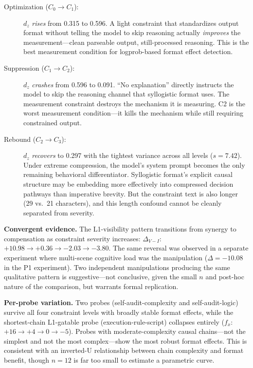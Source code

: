 \documentclass[11pt]{article}
\begin{document}
\begin{description}
\item[Optimization ($C_0 \to C_1$):] $d_z$ \textit{rises} from 0.315 to 0.596.
  A light constraint that standardizes output format without telling the model
  to skip reasoning actually \textit{improves} the measurement---clean parseable
  output, still-processed reasoning. This is the best measurement condition for
  logprob-based format effect detection.

\item[Suppression ($C_1 \to C_2$):] $d_z$ \textit{crashes} from 0.596 to 0.091.
  ``No explanation'' directly instructs the model to skip the
  reasoning channel that syllogistic format uses. The measurement constraint
  destroys the mechanism it is measuring. C2 is the worst measurement
  condition---it kills the mechanism while still requiring constrained output.

\item[Rebound ($C_2 \to C_3$):] $d_z$ \textit{recovers} to 0.297 with the
  tightest variance across all levels ($s=7.42$). Under extreme compression,
  the model's system prompt becomes the only remaining behavioral
  differentiator. Syllogistic format's explicit causal structure may be
  embedding more effectively into compressed decision pathways than imperative
  brevity. But the constraint text is also longer (29 vs.~21 characters), and
  this length confound cannot be cleanly separated from severity.
\end{description}

\textbf{Convergent evidence.} The L1-visibility pattern transitions from synergy
to compensation as constraint severity increases:
$\Delta_{V-I}$: $+10.98 \to +0.36 \to -2.03 \to -3.80$. The same reversal
was observed in a separate experiment where multi-scene cognitive load was the
manipulation ($\Delta=-10.08$ in the P1 experiment). Two independent
manipulations producing the same qualitative pattern is suggestive---not
conclusive, given the small $n$ and post-hoc nature of the comparison,
but warrants formal replication.

\textbf{Per-probe variation.} Two probes (self-audit-complexity and
self-audit-logic) survive all four constraint levels with broadly stable format
effects, while the shortest-chain L1-gatable probe (execution-rule-script)
collapses entirely ($f_x$: $+16 \to +4 \to 0 \to -5$). Probes with
moderate-complexity causal chains---not the simplest and not the most
complex---show the most robust format effects. This is consistent with an
inverted-U relationship between chain complexity and format benefit, though
$n=12$ is far too small to estimate a parametric curve.
\end{document}
